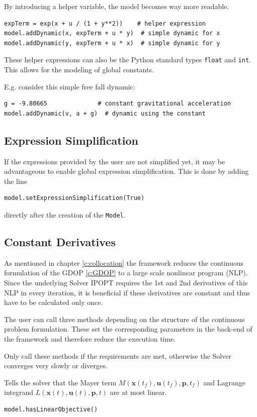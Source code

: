 \documentclass[12pt]{article}
\renewcommand{\v}{\bm}
\begin{document}
By introducing a helper variable, the model becomes way more readable.

\begin{lstlisting}
expTerm = exp(x + u / (1 + y**2))	 # helper expression
model.addDynamic(x, expTerm + u * y)  # simple dynamic for x
model.addDynamic(y, expTerm + u * x)  # simple dynamic for y
	\end{lstlisting}

These helper expressions can also be the Python standard types
\texttt{float} and \texttt{int}. This allows for the modeling of global
constants.

E.g. consider this simple free fall dynamic:
\begin{lstlisting}
g = -9.80665		      # constant gravitational acceleration  
model.addDynamic(v, a + g)  # dynamic using the constant
	\end{lstlisting}

\subsection{Expression Simplification}
If the expressions provided by the user are not simplified yet, it
may be advantageous to enable global expression simplification. This is done by
adding the line
\begin{lstlisting}
model.setExpressionSimplification(True)
	\end{lstlisting}
directly after the creation of the \texttt{Model}.

\subsection{Constant Derivatives}
As mentioned in chapter \eqref{c:collocation} the framework reduces the
continuous formulation of the GDOP \eqref{c:GDOP} to a large scale nonlinear
program (NLP). Since the underlying Solver IPOPT requires the 1st and 2nd
derivatives of this NLP in every iteration, it is beneficial if these
derivatives are constant and thus have to be calculated only once.

The user can call three methods depending on the structure of the
continuous problem formulation. These set the corresponding parameters in
the back-end of the framework and therefore reduce the execution time.

Only call these methods if the requirements are met, otherwise the
Solver converges very slowly or diverges.

\begin{mdframed}[backgroundcolor=gray!10, roundcorner=10pt,
		linewidth=1pt]

	Tells the solver that the Mayer term $M(\v{x}(t_f), \v{u}(t_f),
		\v{p}, t_f)$ and Lagrange integrand $L(\v{x}(t), \v{u}(t),
		\v{p}, t)$ are at
	most linear.

	\begin{lstlisting}
model.hasLinearObjective()
		\end{lstlisting}
	\label{hasLinearObjective}
\end{mdframed}
\end{document}
